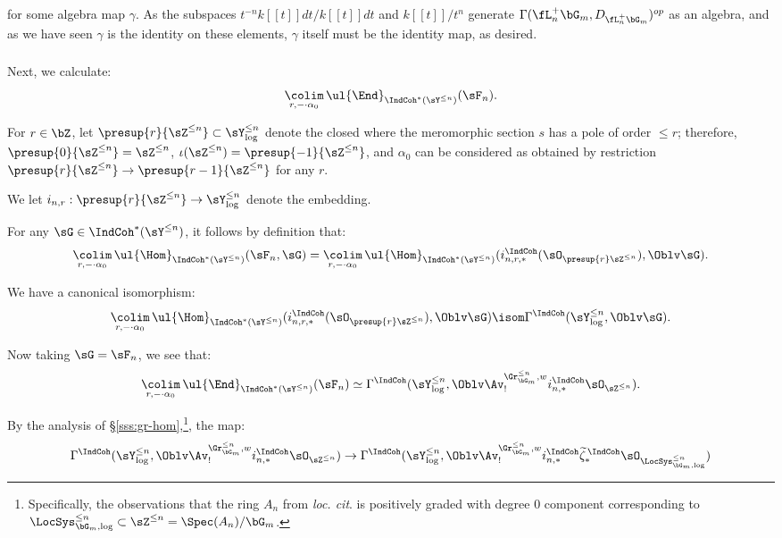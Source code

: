  for some algebra map $\gamma$. As the subspaces
$t^{-n}k[[t]]dt/k[[t]]dt$ and $k[[t]]/t^n$
generate $\Gamma(\fL_n^+ \bG_m,D_{\fL_n^+ \bG_m})^{op}$ as an algebra,
and as we have seen $\gamma$ is the identity on these elements, $\gamma$
itself must be the identity map, as desired.

\subsubsection{}

Next, we calculate:
%
\[
\underset{r,-\cdot \alpha_0}{\colim} \, \ul{\End}_{\IndCoh^*(\sY^{\leq n})}(\sF_n).
\]

For $r \in \bZ$, let $\presup{r}{\sZ^{\leq n}} \subset \sY_{\log}^{\leq n}$
denote the closed where the meromorphic section $s$ has a pole of order $\leq r$;
therefore, $\presup{0}{\sZ^{\leq n}} = \sZ^{\leq n}$,
$\iota(\sZ^{\leq n}) = \presup{-1}{\sZ^{\leq n}}$, and $\alpha_0$ can be
considered as obtained by restriction
$\presup{r}{\sZ^{\leq n}} \to \presup{r-1}{\sZ^{\leq n}}$ for any $r$.

We let $i_{n,r}:\presup{r}{\sZ^{\leq n}} \to \sY_{\log}^{\leq n}$ denote
the embedding.

For any $\sG \in \IndCoh^*(\sY^{\leq n})$, it follows by definition
that:
%
\[
\underset{r,-\cdot \alpha_0}{\colim} \, \ul{\Hom}_{\IndCoh^*(\sY^{\leq n})}(\sF_n,\sG) =
\underset{r,-\cdot \alpha_0}{\colim} \, \ul{\Hom}_{\IndCoh^*(\sY^{\leq n})}
(i_{n,r,*}^{\IndCoh}(\sO_{\presup{r}\sZ^{\leq n}}),\Oblv\sG).
\]

 We have a canonical isomorphism:
%
\[
\underset{r,-\cdot \alpha_0}{\colim} \, \ul{\Hom}_{\IndCoh^*(\sY^{\leq n})}
(i_{n,r,*}^{\IndCoh}(\sO_{\presup{r}\sZ^{\leq n}}),\Oblv\sG) \isom
\Gamma^{\IndCoh}(\sY_{\log}^{\leq n},\Oblv \sG).
\]

Now taking $\sG = \sF_n$, we see that:
%
\[
\underset{r,-\cdot \alpha_0}{\colim} \, \ul{\End}_{\IndCoh^*(\sY^{\leq n})}(\sF_n)
\simeq \Gamma^{\IndCoh}(\sY_{\log}^{\leq n},\Oblv \Av_!^{\Gr_{\bG_m}^{\leq n},w}
i_{n,*}^{\IndCoh}\sO_{\sZ^{\leq n}}).
\]

By the analysis of \S \ref{sss:gr-hom},\footnote{Specifically, the
observations that the ring $A_n$ from
\emph{loc. cit}. is positively graded with degree $0$ component corresponding to
$\LocSys_{\bG_m,\log}^{\leq n} \subset \sZ^{\leq n} = \Spec(A_n)/\bG_m$.},
the map:
%
\[
\Gamma^{\IndCoh}(\sY_{\log}^{\leq n},\Oblv \Av_!^{\Gr_{\bG_m}^{\leq n},w}
i_{n,*}^{\IndCoh}\sO_{\sZ^{\leq n}}) \to
\Gamma^{\IndCoh}(\sY_{\log}^{\leq n},\Oblv \Av_!^{\Gr_{\bG_m}^{\leq n},w}
i_{n,*}^{\IndCoh}\widetilde{\zeta}_*^{\,\IndCoh}\sO_{\LocSys_{\bG_m,\log}^{\leq n}})
\]

